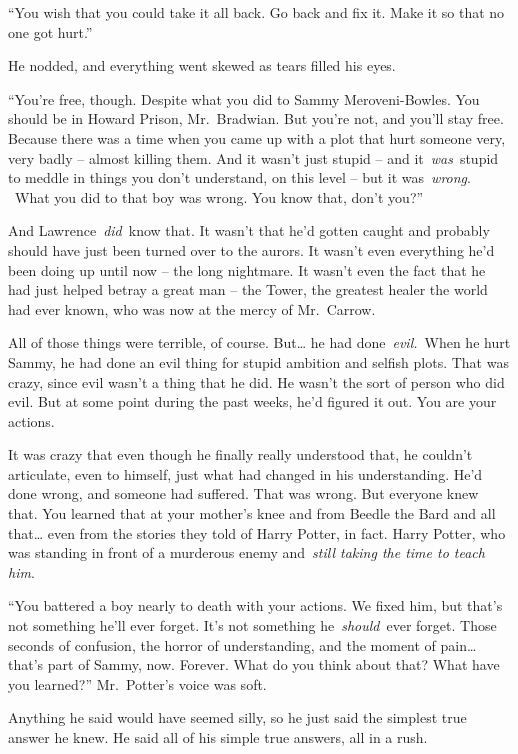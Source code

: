 ``You wish that you could take it all back. Go back and fix it. Make it
so that no one got hurt.''

He nodded, and everything went skewed as tears filled his eyes.

``You're free, though. Despite what you did to Sammy Meroveni-Bowles.
You should be in Howard Prison, Mr.~Bradwian. But you're not, and you'll
stay free. Because there was a time when you came up with a plot that
hurt someone very, very badly -- almost killing them. And it wasn't just
stupid -- and it~\emph{was}~stupid to meddle in things you don't
understand, on this level -- but it was~\emph{wrong}. ~What you did to
that boy was wrong. You know that, don't you?''

And Lawrence~\emph{did}~know that. It wasn't that he'd gotten caught and
probably should have just been turned over to the aurors. It wasn't even
everything he'd been doing up until now -- the long nightmare. It wasn't
even the fact that he had just helped betray a great man -- the Tower,
the greatest healer the world had ever known, who was now at the mercy
of Mr.~Carrow.

All of those things were terrible, of course. But\ldots{} he had
done~\emph{evil.}~When he hurt Sammy, he had done an evil thing for
stupid ambition and selfish plots. That was crazy, since evil wasn't a
thing that he did. He wasn't the sort of person who did evil. But at
some point during the past weeks, he'd figured it out. You are your
actions.

It was crazy that even though he finally really understood that, he
couldn't articulate, even to himself, just what had changed in his
understanding. He'd done wrong, and someone had suffered. That was
wrong. But everyone knew that. You learned that at your mother's knee
and from Beedle the Bard and all that\ldots{} even from the stories they
told of Harry Potter, in fact. Harry Potter, who was standing in front
of a murderous enemy and~\emph{still taking the time to teach him}.

``You battered a boy nearly to death with your actions. We fixed him,
but that's not something he'll ever forget. It's not something
he~\emph{should}~ever forget. Those seconds of confusion, the horror of
understanding, and the moment of pain\ldots{} that's part of Sammy, now.
Forever. What do you think about that? What have you learned?''
Mr.~Potter's voice was soft.

Anything he said would have seemed silly, so he just said the simplest
true answer he knew. He said all of his simple true answers, all in a
rush.

